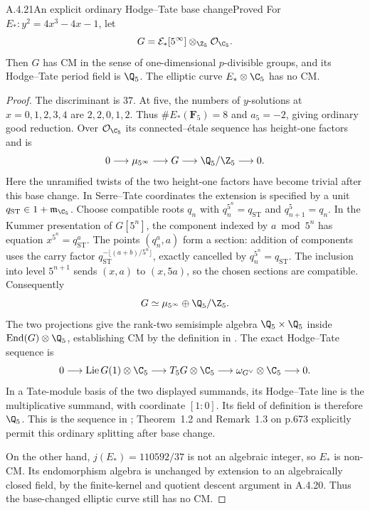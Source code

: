 \begin{result}{A.4.21}{An explicit ordinary Hodge--Tate base change}{Proved}
For $E_*:y^2=4x^3-4x-1$, let
\[
 G=\mathcal E_*[5^\infty]\otimes_{\Z_5}\mathcal O_{\C_5}.
\]
Then $G$ has CM in the sense of one-dimensional $p$-divisible groups, and its Hodge--Tate period field is $\Q_5$. The elliptic curve $E_*\otimes\C_5$ has no CM.
\end{result}
\begin{proof}
The discriminant is $37$. At five, the numbers of $y$-solutions at $x=0,1,2,3,4$ are $2,2,0,1,2$. Thus $\#E_*(\mathbf F_5)=8$ and $a_5=-2$, giving ordinary good reduction. Over $\mathcal O_{\C_5}$ its connected--\'etale sequence has height-one factors and is
\[
 0\longrightarrow\mu_{5^\infty}\longrightarrow G
 \longrightarrow\Q_5/\Z_5\longrightarrow0.
\]
Here the unramified twists of the two height-one factors have become trivial after this base change. In Serre--Tate coordinates the extension is specified by a unit $q_{\mathrm{ST}}\in1+\mathfrak m_{\C_5}$. Choose compatible roots $q_n$ with $q_n^{5^n}=q_{\mathrm{ST}}$ and $q_{n+1}^5=q_n$. In the Kummer presentation of $G[5^n]$, the component indexed by $a\bmod5^n$ has equation $x^{5^n}=q_{\mathrm{ST}}^a$. The points $(q_n^a,a)$ form a section: addition of components uses the carry factor $q_{\mathrm{ST}}^{-\lfloor(a+b)/5^n\rfloor}$, exactly cancelled by $q_n^{5^n}=q_{\mathrm{ST}}$. The inclusion into level $5^{n+1}$ sends $(x,a)$ to $(x,5a)$, so the chosen sections are compatible. Consequently
\[
 G\simeq\mu_{5^\infty}\oplus\Q_5/\Z_5.
\]
The two projections give the rank-two semisimple algebra $\Q_5\times\Q_5$ inside $\operatorname{End}(G)\otimes\Q_5$, establishing CM by the definition in \cite[p.673]{EllHowe2018}. The exact Hodge--Tate sequence is
\[
 0\longrightarrow\operatorname{Lie}G(1)\otimes\C_5
 \longrightarrow T_5G\otimes\C_5
 \longrightarrow\omega_{G^\vee}\otimes\C_5\longrightarrow0.
\]
In a Tate-module basis of the two displayed summands, its Hodge--Tate line is the multiplicative summand, with coordinate $[1:0]$. Its field of definition is therefore $\Q_5$. This is the sequence in \cite[(1.1), p.672]{EllHowe2018}; Theorem~1.2 and Remark~1.3 on p.673 explicitly permit this ordinary splitting after base change.

On the other hand, $j(E_*)=110592/37$ is not an algebraic integer, so $E_*$ is non-CM. Its endomorphism algebra is unchanged by extension to an algebraically closed field, by the finite-kernel and quotient descent argument in A.4.20. Thus the base-changed elliptic curve still has no CM.
\end{proof}

